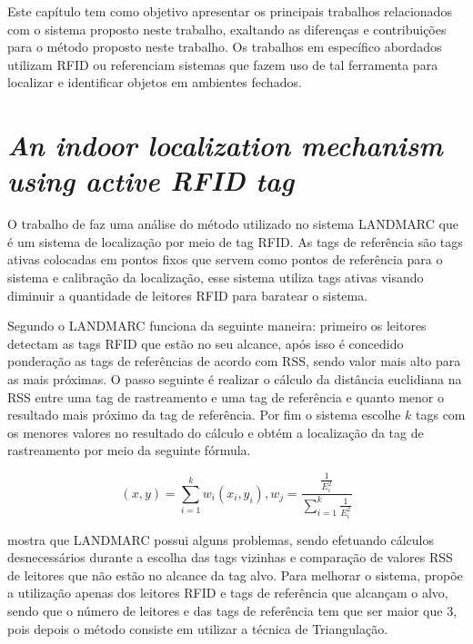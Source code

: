 
\label{chapter:correlatos}

Este capítulo tem como objetivo apresentar os principais trabalhos relacionados com o sistema proposto neste trabalho, 
exaltando as diferenças e contribuições para o método proposto neste trabalho. Os trabalhos em específico abordados 
utilizam RFID ou referenciam sistemas que fazem uso de tal ferramenta para localizar e identificar objetos em ambientes 
fechados.

%
%
\section{\textit{An indoor localization mechanism using active RFID tag}}

O trabalho de  faz uma análise do método utilizado no sistema LANDMARC 
que é um sistema de localização por meio de tag RFID. As tags de referência são tags ativas colocadas em pontos fixos 
que servem como pontos de referência para o sistema e calibração da localização, esse sistema utiliza tags ativas visando 
diminuir a quantidade de leitores RFID para baratear o sistema.

Segundo  o LANDMARC funciona da seguinte maneira: primeiro os leitores detectam as tags RFID que estão 
no seu alcance, após isso é concedido ponderação as tags de referências de acordo com RSS, sendo valor mais alto para as mais 
próximas. O passo seguinte é realizar o cálculo da distância euclidiana na RSS entre uma tag de rastreamento e uma tag de 
referência e quanto menor o resultado mais próximo da tag de referência. Por fim o sistema escolhe $k$ tags com os menores valores no 
resultado do cálculo e obtém a localização da tag de rastreamento por meio da seguinte fórmula.

\begin{equation}
(x,y) = \sum^k_{i=1}w_i(x_i,y_i), w_j=\frac{\frac{1}{E_i^2}}{\sum_{i=1}^k\frac{1}{E^2_i}} 
\end{equation}


 mostra que LANDMARC possui alguns problemas, sendo efetuando cálculos desnecessários 
durante a escolha das tags vizinhas e comparação de valores RSS de leitores que não estão no alcance da tag alvo. 
Para melhorar o sistema,  propõe a utilização apenas dos leitores RFID  e tags de referência 
que alcançam o alvo, sendo que o número de leitores e das tags de referência tem que ser maior que 
$3$, pois depois o método consiste em utilizar a técnica de Triangulação.


